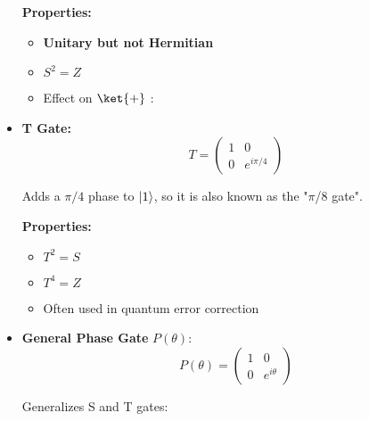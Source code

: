 \begin{itemize}
    \vspace{0.3cm}

    \textbf{Properties:}

    \begin{itemize}
      \item \textbf{Unitary but not Hermitian}
      \item $S^2 = Z$
      \item Effect on $\ket{+}$ : 
    \end{itemize}

  \item \textbf{T Gate:}
    \[
      \boxed{
        T = \begin{pmatrix} 1 & 0 \\ 0 & e^{i\pi/4} \end{pmatrix}
      }
    \]

    Adds a $\pi/4$ phase to $\left|1\right\rangle$, so it is also known as the "$\pi$/8 gate".

    \vspace{0.3cm}

    \textbf{Properties:}

    \begin{itemize}
      \item $T^2 = S$
      \item $T^4 = Z$
      \item Often used in quantum error correction
    \end{itemize}

  \item \textbf{General Phase Gate } $P(\theta)$:
    \[
      P(\theta) = \begin{pmatrix} 1 & 0 \\ 0 & e^{i\theta} \end{pmatrix}
    \]

    Generalizes S and T gates: 

\end{itemize}


